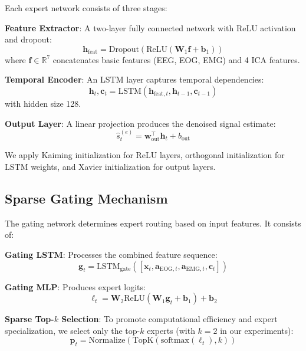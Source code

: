 \documentclass{article}
\begin{document}
Each expert network consists of three stages:

\textbf{Feature Extractor}: A two-layer fully connected network with ReLU activation and dropout:
\begin{equation}
\mathbf{h}_{\text{feat}} = \text{Dropout}(\text{ReLU}(\mathbf{W}_1 \mathbf{f} + \mathbf{b}_1))
\end{equation}
where $\mathbf{f} \in \mathbb{R}^7$ concatenates basic features (EEG, EOG, EMG) and 4 ICA features.

\textbf{Temporal Encoder}: An LSTM layer captures temporal dependencies:
\begin{equation}
\mathbf{h}_t, \mathbf{c}_t = \text{LSTM}(\mathbf{h}_{\text{feat},t}, \mathbf{h}_{t-1}, \mathbf{c}_{t-1})
\end{equation}
with hidden size 128.

\textbf{Output Layer}: A linear projection produces the denoised signal estimate:
\begin{equation}
\hat{s}_t^{(e)} = \mathbf{w}_{\text{out}}^\top \mathbf{h}_t + b_{\text{out}}
\end{equation}

We apply Kaiming initialization \cite{he2015delving} for ReLU layers, orthogonal initialization for LSTM weights, and Xavier initialization \cite{glorot2010understanding} for output layers.

\subsection{Sparse Gating Mechanism}

The gating network determines expert routing based on input features. It consists of:

\textbf{Gating LSTM}: Processes the combined feature sequence:
\begin{equation}
\mathbf{g}_t = \text{LSTM}_{\text{gate}}([\mathbf{x}_t, \mathbf{a}_{\text{EOG},t}, \mathbf{a}_{\text{EMG},t}, \mathbf{c}_t])
\end{equation}

\textbf{Gating MLP}: Produces expert logits:
\begin{equation}
\boldsymbol{\ell}_t = \mathbf{W}_2 \text{ReLU}(\mathbf{W}_1 \mathbf{g}_t + \mathbf{b}_1) + \mathbf{b}_2
\end{equation}

\textbf{Sparse Top-$k$ Selection}: To promote computational efficiency and expert specialization, we select only the top-$k$ experts (with $k=2$ in our experiments):
\begin{equation}
\mathbf{p}_t = \text{Normalize}(\text{TopK}(\text{softmax}(\boldsymbol{\ell}_t), k))
\end{equation}
\end{document}
